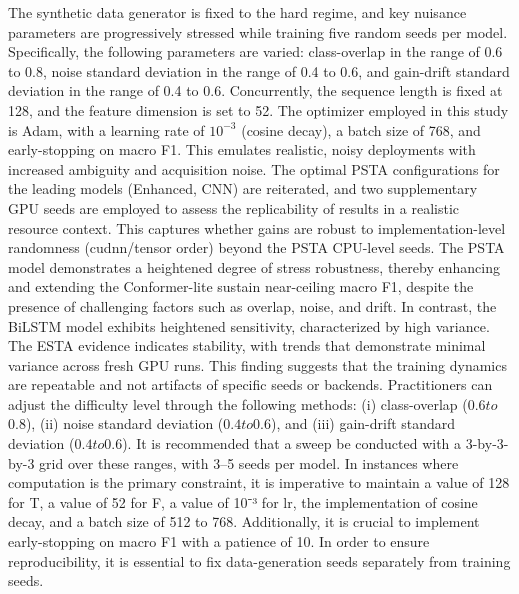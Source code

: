 \documentclass[journal]{IEEEtran}
\begin{document}
The synthetic data generator is fixed to the hard regime, and key nuisance parameters are progressively stressed while training five random seeds per model. Specifically, the following parameters are varied: class-overlap in the range of 0.6 to 0.8, noise standard deviation in the range of 0.4 to 0.6, and gain-drift standard deviation in the range of 0.4 to 0.6. Concurrently, the sequence length is fixed at 128, and the feature dimension is set to 52. The optimizer employed in this study is Adam, with a learning rate of $10^{-3}$ (cosine decay), a batch size of 768, and early-stopping on macro F1. This emulates realistic, noisy deployments with increased ambiguity and acquisition noise.
The optimal PSTA configurations for the leading models (Enhanced, CNN) are reiterated, and two supplementary GPU seeds are employed to assess the replicability of results in a realistic resource context. This captures whether gains are robust to implementation-level randomness (cudnn/tensor order) beyond the PSTA CPU-level seeds.
The PSTA model demonstrates a heightened degree of stress robustness, thereby enhancing and extending the Conformer-lite sustain near-ceiling macro F1, despite the presence of challenging factors such as overlap, noise, and drift. In contrast, the BiLSTM model exhibits heightened sensitivity, characterized by high variance.
The ESTA evidence indicates stability, with trends that demonstrate minimal variance across fresh GPU runs. This finding suggests that the training dynamics are repeatable and not artifacts of specific seeds or backends.
Practitioners can adjust the difficulty level through the following methods: (i) class-overlap ($0.6 to $0.8), (ii) noise standard deviation ($0.4 to $0.6), and (iii) gain-drift standard deviation ($0.4 to $0.6). It is recommended that a sweep be conducted with a 3-by-3-by-3 grid over these ranges, with 3–5 seeds per model. In instances where computation is the primary constraint, it is imperative to maintain a value of 128 for T, a value of 52 for F, a value of 10⁻³ for lr, the implementation of cosine decay, and a batch size of 512 to 768. Additionally, it is crucial to implement early-stopping on macro F1 with a patience of 10. In order to ensure reproducibility, it is essential to fix data-generation seeds separately from training seeds.
\end{document}
